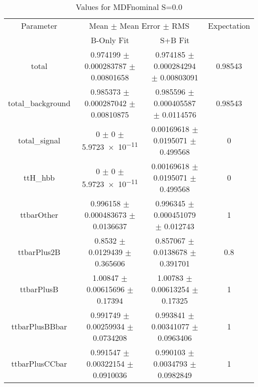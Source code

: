 \begin{table}
\centering
\caption{Values for MDFnominal S=0.0}
\begin{tabular}{cccc}
\toprule
Parameter & \multicolumn{2}{c}{Mean $\pm$ Mean Error $\pm$ RMS} & Expectation\\
 & B-Only Fit & S+B Fit & \\
\midrule
total & \num{0.974199} $\pm$ \num{0.000283787} $\pm$ \num{0.00801658} & \num{0.974185} $\pm$ \num{0.000284294} $\pm$ \num{0.00803091} & \num{0.98543}\\
total\_background & \num{0.985373} $\pm$ \num{0.000287042} $\pm$ \num{0.00810875} & \num{0.985596} $\pm$ \num{0.000405587} $\pm$ \num{0.0114576} & \num{0.98543}\\
total\_signal & \num{0} $\pm$ \num{0} $\pm$ \num{5.9723e-11} & \num{0.00169618} $\pm$ \num{0.0195071} $\pm$ \num{0.499568} & \num{0}\\
ttH\_hbb & \num{0} $\pm$ \num{0} $\pm$ \num{5.9723e-11} & \num{0.00169618} $\pm$ \num{0.0195071} $\pm$ \num{0.499568} & \num{0}\\
ttbarOther & \num{0.996158} $\pm$ \num{0.000483673} $\pm$ \num{0.0136637} & \num{0.996345} $\pm$ \num{0.000451079} $\pm$ \num{0.012743} & \num{1}\\
ttbarPlus2B & \num{0.8532} $\pm$ \num{0.0129439} $\pm$ \num{0.365606} & \num{0.857067} $\pm$ \num{0.0138678} $\pm$ \num{0.391701} & \num{0.8}\\
ttbarPlusB & \num{1.00847} $\pm$ \num{0.00615696} $\pm$ \num{0.17394} & \num{1.00783} $\pm$ \num{0.00613254} $\pm$ \num{0.17325} & \num{1}\\
ttbarPlusBBbar & \num{0.991749} $\pm$ \num{0.00259934} $\pm$ \num{0.0734208} & \num{0.993841} $\pm$ \num{0.00341077} $\pm$ \num{0.0963406} & \num{1}\\
ttbarPlusCCbar & \num{0.991547} $\pm$ \num{0.00322154} $\pm$ \num{0.0910036} & \num{0.990103} $\pm$ \num{0.0034793} $\pm$ \num{0.0982849} & \num{1}\\
\bottomrule
\end{tabular}
\end{table}